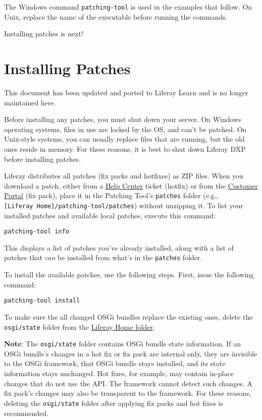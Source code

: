 The Windows command \texttt{patching-tool} is used in the examples that
follow. On Unix, replace the name of the executable before running the
commands.

Installing patches is next!

\chapter{Installing Patches}\label{installing-patches}

{This document has been updated and ported to Liferay Learn and is no
longer maintained here.}

Before installing any patches, you must shut down your server. On
Windows operating systems, files in use are locked by the OS, and can't
be patched. On Unix-style systems, you can usually replace files that
are running, but the old ones reside in memory. For these reasons, it is
best to shut down Liferay DXP before installing patches.

Liferay distributes all patches (fix packs and hotfixes) as ZIP files.
When you download a patch, either from a
\href{https://help.liferay.com/hc}{Help Center} ticket (hotfix) or from
the \href{https://customer.liferay.com/downloads}{Customer Portal} (fix
pack), place it in the Patching Tool's \texttt{patches} folder (e.g.,
\texttt{{[}Liferay\ Home{]}/patching-tool/patches}) without unzipping
it. To list your installed patches and available local patches, execute
this command:

\begin{verbatim}
patching-tool info
\end{verbatim}

This displays a list of patches you've already installed, along with a
list of patches that \emph{can} be installed from what's in the
\texttt{patches} folder.

To install the available patches, use the following steps. First, issue
the following command:

\begin{verbatim}
patching-tool install
\end{verbatim}

To make sure the all changed OSGi bundles replace the existing ones,
delete the \texttt{osgi/state} folder from the
\href{/docs/7-2/deploy/-/knowledge_base/d/liferay-home}{Liferay Home
folder}.

\noindent\hrulefill

\textbf{Note}: The \texttt{osgi/state} folder contains OSGi bundle state
information. If an OSGi bundle's changes in a hot fix or fix pack are
internal only, they are invisible to the OSGi framework, that OSGi
bundle stays installed, and its state information stays unchanged. Hot
fixes, for example, may contain in-place changes that do not use the
API. The framework cannot detect such changes. A fix pack's changes may
also be transparent to the framework. For these reasons, deleting the
\texttt{osgi/state} folder after applying fix packs and hot fixes is
recommended.


